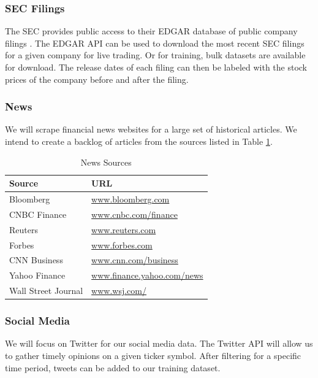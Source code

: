 \documentclass[conference]{IEEEtran}
\begin{document}
\subsubsection{SEC Filings}
The SEC provides public access to their EDGAR database of public company filings \cite{Sec.gov_2021}. The EDGAR API can be used to download the most recent SEC filings for a given company for live trading. Or for training, bulk datasets are available for download. The release dates of each filing can then be labeled with the stock prices of the company before and after the filing.
\subsubsection{News}
We will scrape financial news websites for a large set of historical articles. We intend to create a backlog of articles from the sources listed in Table \ref{table:newsSources}.
\begin{table}[ht]
    \caption{News Sources}
    \centering
    \begin{tabular}{|l|l|}
        \hline
        \textbf{Source} & \textbf{URL} \\
        \hline
        Bloomberg & \href{https://www.bloomberg.com/}{www.bloomberg.com} \\
        \hline
        CNBC Finance & \href{https://www.cnbc.com/finance/}{www.cnbc.com/finance} \\
        \hline
        Reuters & \href{https://www.reuters.com/}{www.reuters.com} \\
        \hline
        Forbes & \href{https://www.forbes.com/}{www.forbes.com} \\
        \hline
        CNN Business & \href{https://www.cnn.com/business}{www.cnn.com/business} \\
        \hline
        Yahoo Finance & \href{https://finance.yahoo.com/news}{www.finance.yahoo.com/news} \\
        \hline
        Wall Street Journal & \href{https://www.wsj.com/}{www.wsj.com/} \\
        \hline
    \end{tabular}
    \label{table:newsSources}
\end{table}

\subsubsection{Social Media}
We will focus on Twitter for our social media data. The Twitter API \cite{twitterapi} will allow us to gather timely opinions on a given ticker symbol. After filtering for a specific time period, tweets can be added to our training dataset.
\end{document}
